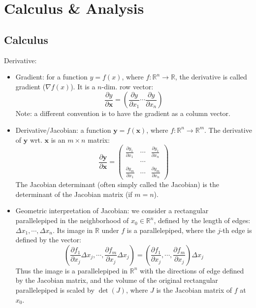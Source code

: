 \documentclass{report}
\begin{document}
\chapter{Calculus \& Analysis}

\section{Calculus}

Derivative:
\begin{itemize}
\item Gradient: for a function $y = f(x)$, where $f: \mathbb{R}^n \rightarrow \mathbb{R}$, the derivative is called gradient ($\nabla f(x)$). It is a $n$-dim. row vector: 
\begin{equation}
\frac{\partial y}{\partial \mathbf{x}} = \left(\frac{\partial y}{\partial x_1} \cdots \frac{\partial y}{\partial x_n}\right) 	
\end{equation}
Note: a different convention is to have the gradient as a column vector. 

\item Derivative/Jacobian: a function $\mathbf{y} = f(\mathbf{x})$, where $f: \mathbb{R}^n \rightarrow \mathbb{R}^m$. The derivative of $\mathbf{y}$ wrt. $\mathbf{x}$ is an $m \times n$ matrix: 
\begin{equation}
\frac{\partial \mathbf{y}}{\partial \mathbf{x}} = \left( 
\begin{array}{llll}
\frac{\partial y_1}{\partial x_1} & \cdots & \frac{\partial y_1}{\partial x_n}\\
 & \cdots & \\
\frac{\partial y_m}{\partial x_1} & \cdots & \frac{\partial y_m}{\partial x_n} 
\end{array}
\right)
\end{equation}
The Jacobian determinant (often simply called the Jacobian) is the determinant of the Jacobian matrix (if $m = n$).

\item Geometric interpretation of Jacobian: we consider a rectangular parallelepiped in the neighborhood of $x_0 \in \mathbb{R}^n$, defined by the length of edges: $\Delta x_1, \cdots, \Delta x_n$. Its image in $\mathbb{R}$ under $f$ is a parallelepiped, where the $j$-th edge is defined by the vector: 
\begin{equation}
\left( \frac{\partial f_1}{\partial x_j} \Delta x_j, \cdots, \frac{\partial f_m}{\partial x_j} \Delta x_j \right)	= \left( \frac{\partial f_1}{\partial x_j}, \cdots, \frac{\partial f_m}{\partial x_j} \right) \Delta x_j
\end{equation}
Thus the image is a parallelepiped in $\mathbb{R}^n$ with the directions of edge defined by the Jacobian matrix, and the volume of the original rectangular parallelepiped is scaled by $\det (J)$, where $J$ is the Jacobian matrix of $f$ at $x_0$. 
 
\end{itemize}
\end{document}
